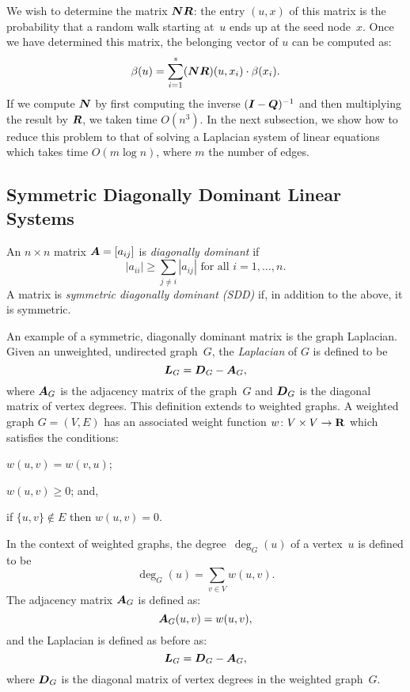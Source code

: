 We wish to determine the matrix $\boldsymbol{N} \boldsymbol{R}$: the entry $(u, x)$ of this 
matrix is the probability that a random walk starting at~$u$ ends up at the seed 
node~$x$. Once we have determined this matrix, the belonging vector of $u$ can 
be computed as:
\begin{equation}\label{eqn:belonging_vector}
	\beta(u) = \sum_{i = 1}^{s} (\boldsymbol{N} \boldsymbol{R}) (u, x_i) \cdot \beta(x_i).
\end{equation}
If we compute $\boldsymbol{N}$ by first computing the inverse $(\boldsymbol{I} - \boldsymbol{Q})^{-1}$
and then multiplying the result by $\boldsymbol{R}$, we taken time $O(n^3)$. In the 
next subsection, we show how to reduce this problem to that of solving a 
Laplacian system of linear equations which takes time $O(m \log n)$, where $m$
the number of edges. 

\subsection{Symmetric Diagonally Dominant Linear Systems}

An $n \times n$ matrix $\boldsymbol{A} = [a_{ij}]$ is \emph{diagonally dominant} if 
\[
	|a_{ii}| \geq \sum_{j \neq i} {|a_{ij}|} \mbox{ for all } i = 1, \ldots, n.
\] 
A matrix is \emph{symmetric diagonally dominant (SDD)} if, in addition to the above, 
it is symmetric. 

An example of a symmetric, diagonally dominant matrix is the graph Laplacian. 
Given an unweighted, undirected graph~$G$, the \emph{Laplacian} of $G$ 
is defined to be 
\[
\boldsymbol{L}_G = \boldsymbol{D}_G - \boldsymbol{A}_G,
\] 
where $\boldsymbol{A}_G$ is the adjacency matrix of the graph~$G$ and $\boldsymbol{D}_G$ 
is the diagonal matrix of vertex degrees. This definition extends 
to weighted graphs. A weighted graph $G = (V, E)$ has an associated weight function 
$w \colon V \times V \to \mathbf{R}$ which satisfies the conditions: 
\begin{inparaenum}[(1)]
	\item $w(u, v) = w(v, u)$;  
	\item $w(u, v) \geq 0$; and, 
	\item if $\{u, v\} \notin E$ then $w(u, v) = 0$. 
\end{inparaenum}
In the context of weighted graphs, the degree~$\deg_G (u)$ of a vertex~$u$ is defined to be 
\[\label{eqn:weighted_degree}
	\deg_G (u) = \sum_{v \in V} w(u, v). 
\] 
The adjacency matrix $\boldsymbol{A}_{G}$ is defined as:
\[\label{eqn:weighted_adj_matrix}
	\boldsymbol{A}_{G}(u, v) = w(u, v),
\]
and the Laplacian is defined as before as: 
\[\label{eqn:weighted_laplacian}
	\boldsymbol{L}_G = \boldsymbol{D}_G - \boldsymbol{A}_G,
\]
where $\boldsymbol{D}_G$ is the diagonal matrix of vertex degrees in the weighted graph~$G$.

